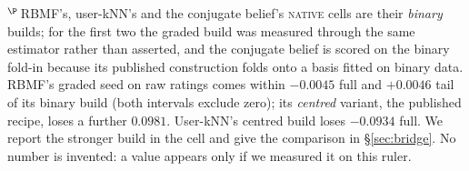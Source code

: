 \documentclass[11pt]{article}
\begin{document}
\begin{table}[!htbp]
{$^{\P}$\,RBMF's, user-kNN's and the conjugate belief's \textsc{native} cells are their \emph{binary} builds; for the first two the graded build was measured through the same estimator rather than asserted, and the conjugate belief is scored on the binary fold-in because its published construction folds onto a basis fitted on binary data. RBMF's graded seed on raw ratings comes within $-0.0045$ full and $+0.0046$ tail of its binary build (both intervals exclude zero); its \emph{centred} variant, the published recipe, loses a further $0.0981$. User-kNN's centred build loses $-0.0934$ full. We report the stronger build in the cell and give the comparison in \S\ref{sec:bridge}.
No number is invented: a value appears only if we measured it on this ruler.}
\label{tab:master}
\end{table}
\end{document}
